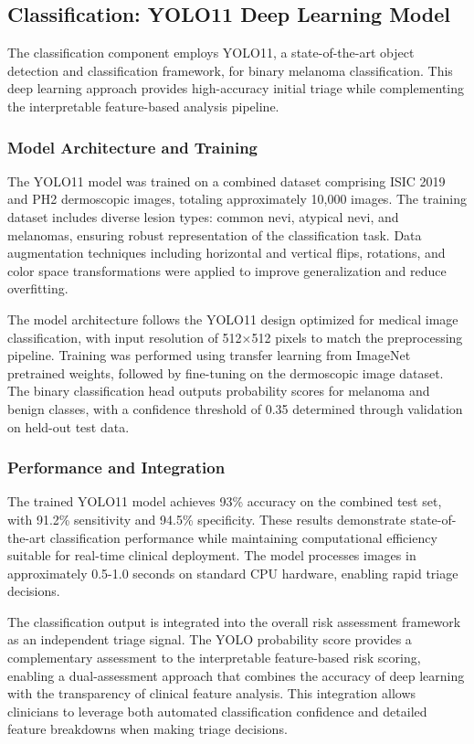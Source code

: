 \documentclass[conference]{IEEEtran}
\begin{document}
\subsection{Classification: YOLO11 Deep Learning Model}

The classification component employs YOLO11, a state-of-the-art object detection and classification framework, for binary melanoma classification. This deep learning approach provides high-accuracy initial triage while complementing the interpretable feature-based analysis pipeline.

\subsubsection{Model Architecture and Training}

The YOLO11 model was trained on a combined dataset comprising ISIC 2019 and PH2 dermoscopic images, totaling approximately 10,000 images. The training dataset includes diverse lesion types: common nevi, atypical nevi, and melanomas, ensuring robust representation of the classification task. Data augmentation techniques including horizontal and vertical flips, rotations, and color space transformations were applied to improve generalization and reduce overfitting.

The model architecture follows the YOLO11 design optimized for medical image classification, with input resolution of 512×512 pixels to match the preprocessing pipeline. Training was performed using transfer learning from ImageNet pretrained weights, followed by fine-tuning on the dermoscopic image dataset. The binary classification head outputs probability scores for melanoma and benign classes, with a confidence threshold of 0.35 determined through validation on held-out test data.

\subsubsection{Performance and Integration}

The trained YOLO11 model achieves 93\% accuracy on the combined test set, with 91.2\% sensitivity and 94.5\% specificity. These results demonstrate state-of-the-art classification performance while maintaining computational efficiency suitable for real-time clinical deployment. The model processes images in approximately 0.5-1.0 seconds on standard CPU hardware, enabling rapid triage decisions.

The classification output is integrated into the overall risk assessment framework as an independent triage signal. The YOLO probability score provides a complementary assessment to the interpretable feature-based risk scoring, enabling a dual-assessment approach that combines the accuracy of deep learning with the transparency of clinical feature analysis. This integration allows clinicians to leverage both automated classification confidence and detailed feature breakdowns when making triage decisions.
\end{document}
